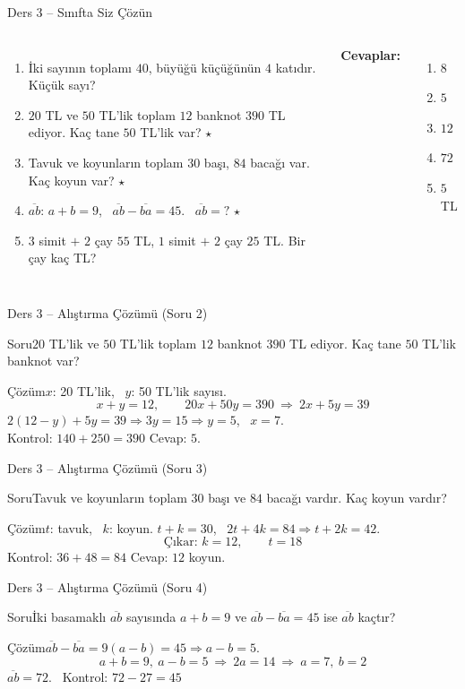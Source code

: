 \documentclass[aspectratio=169,11pt,handout]{beamer}
\newcommand{\soru}[3]{%
\begin{frame}{#1}
  \begin{block}{Soru}\large #2\end{block}
  \pause
  \begin{exampleblock}{Çözüm}\large #3\end{exampleblock}
\end{frame}}
\newcommand{\ab}[1]{\overline{#1}}
\begin{document}
\begin{frame}{Ders 3 -- Sınıfta Siz Çözün}
\begin{columns}[t]
\begin{enumerate}
\item İki sayının toplamı \(40\), büyüğü küçüğünün \(4\) katıdır. Küçük sayı?
\item \(20\) TL ve \(50\) TL'lik toplam \(12\) banknot \(390\) TL ediyor. Kaç tane \(50\) TL'lik var? \(\star\)
\item Tavuk ve koyunların toplam \(30\) başı, \(84\) bacağı var. Kaç koyun var? \(\star\)
\item \(\ab{ab}\): \(a+b=9\), \ \(\ab{ab}-\ab{ba}=45\). \ \(\ab{ab}=?\) \(\star\)
\item \(3\) simit \(+\) \(2\) çay \(55\) TL, \(1\) simit \(+\) \(2\) çay \(25\) TL. Bir çay kaç TL?
\end{enumerate}
\pause
\textbf{Cevaplar:}
\begin{enumerate}
\item \(8\)
\item \(5\)
\item \(12\)
\item \(72\)
\item \(5\) TL
\end{enumerate}
\end{columns}
\vspace{4pt}{\footnotesize \(\star\) işaretli soruların adım adım çözümü sonraki slaytlardadır.}
\end{frame}

\soru{Ders 3 -- Alıştırma Çözümü (Soru 2)}
{\(20\) TL'lik ve \(50\) TL'lik toplam \(12\) banknot \(390\) TL ediyor. Kaç tane \(50\) TL'lik banknot var?}
{\(x\): 20 TL'lik, \ \(y\): 50 TL'lik sayısı.
\[x+y=12,\qquad 20x+50y=390\ \Rightarrow\ 2x+5y=39\]
\(2(12-y)+5y=39\Rightarrow 3y=15\Rightarrow y=5\), \ \(x=7\).\\[2pt]
Kontrol: \(140+250=390\) \checkmark \quad Cevap: \(5\).}

\soru{Ders 3 -- Alıştırma Çözümü (Soru 3)}
{Tavuk ve koyunların toplam \(30\) başı ve \(84\) bacağı vardır. Kaç koyun vardır?}
{\(t\): tavuk, \ \(k\): koyun. \quad \(t+k=30\), \ \(2t+4k=84\Rightarrow t+2k=42\).
\[\text{Çıkar: } k=12,\qquad t=18\]
Kontrol: \(36+48=84\) \checkmark \quad Cevap: \(12\) koyun.}

\soru{Ders 3 -- Alıştırma Çözümü (Soru 4)}
{İki basamaklı \(\ab{ab}\) sayısında \(a+b=9\) ve \(\ab{ab}-\ab{ba}=45\) ise \(\ab{ab}\) kaçtır?}
{\(\ab{ab}-\ab{ba}=9(a-b)=45\Rightarrow a-b=5\).
\[a+b=9,\ a-b=5\ \Rightarrow\ 2a=14\ \Rightarrow\ a=7,\ b=2\]
\(\ab{ab}=72\). \ Kontrol: \(72-27=45\) \checkmark}
\end{document}
